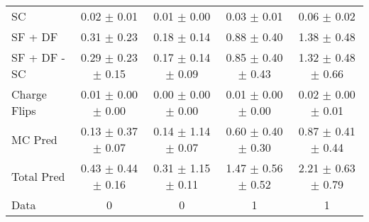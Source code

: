 \begin{tabular}{l|cccc}
                                 SC &  0.02 $\pm$  0.01 &  0.01 $\pm$  0.00 &  0.03 $\pm$  0.01 &  0.06 $\pm$  0.02 \\
                            SF + DF &  0.31 $\pm$  0.23 &  0.18 $\pm$  0.14 &  0.88 $\pm$  0.40 &  1.38 $\pm$  0.48 \\
\hline
                       SF + DF - SC &  0.29 $\pm$  0.23 $\pm$  0.15 &  0.17 $\pm$  0.14 $\pm$  0.09 &  0.85 $\pm$  0.40 $\pm$  0.43 &  1.32 $\pm$  0.48 $\pm$  0.66 \\
\hline\hline
                       Charge Flips &  0.01 $\pm$  0.00 $\pm$  0.00 &  0.00 $\pm$  0.00 $\pm$  0.00 &  0.01 $\pm$  0.00 $\pm$  0.00 &  0.02 $\pm$  0.00 $\pm$  0.01 \\
\hline
                            MC Pred &  0.13 $\pm$  0.37 $\pm$  0.07 &  0.14 $\pm$  1.14 $\pm$  0.07 &  0.60 $\pm$  0.40 $\pm$  0.30 &  0.87 $\pm$  0.41 $\pm$  0.44 \\
\hline
                         Total Pred &  0.43 $\pm$  0.44 $\pm$  0.16 &  0.31 $\pm$  1.15 $\pm$  0.11 &  1.47 $\pm$  0.56 $\pm$  0.52 &  2.21 $\pm$  0.63 $\pm$  0.79 \\
\hline\hline
                               Data &     0 &     0 &     1 &     1 \\
\hline\hline
\end{tabular}

